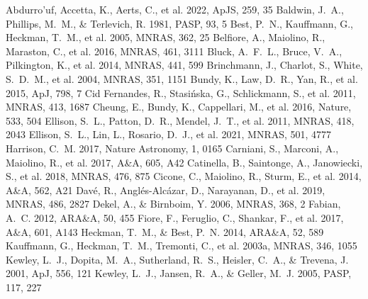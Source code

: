 \documentclass[twocolumn]{aastex631}
\begin{document}

\begin{thebibliography}{}
 Abdurro'uf, Accetta, K., Aerts, C., et al. 2022, ApJS, 259, 35
 Baldwin, J.~A., Phillips, M.~M., \& Terlevich, R. 1981, PASP, 93, 5
 Best, P.~N., Kauffmann, G., Heckman, T.~M., et al. 2005, MNRAS, 362, 25
 Belfiore, A., Maiolino, R., Maraston, C., et al. 2016, MNRAS, 461, 3111
 Bluck, A.~F.~L., Bruce, V.~A., Pilkington, K., et al. 2014, MNRAS, 441, 599
 Brinchmann, J., Charlot, S., White, S.~D.~M., et al. 2004, MNRAS, 351, 1151
 Bundy, K., Law, D.~R., Yan, R., et al. 2015, ApJ, 798, 7
 Cid Fernandes, R., Stasi{\'n}ska, G., Schlickmann, S., et al. 2011, MNRAS, 413, 1687
 Cheung, E., Bundy, K., Cappellari, M., et al. 2016, Nature, 533, 504
 Ellison, S.~L., Patton, D.~R., Mendel, J.~T., et al. 2011, MNRAS, 418, 2043
 Ellison, S.~L., Lin, L., Rosario, D.~J., et al. 2021, MNRAS, 501, 4777
 Harrison, C.~M. 2017, Nature Astronomy, 1, 0165
 Carniani, S., Marconi, A., Maiolino, R., et al. 2017, A\&A, 605, A42
 Catinella, B., Saintonge, A., Janowiecki, S., et al. 2018, MNRAS, 476, 875
 Cicone, C., Maiolino, R., Sturm, E., et al. 2014, A\&A, 562, A21
 Dav{\'e}, R., Angl{\'e}s-Alc{\'a}zar, D., Narayanan, D., et al. 2019, MNRAS, 486, 2827
 Dekel, A., \& Birnboim, Y. 2006, MNRAS, 368, 2
 Fabian, A.~C. 2012, ARA\&A, 50, 455
 Fiore, F., Feruglio, C., Shankar, F., et al. 2017, A\&A, 601, A143
 Heckman, T.~M., \& Best, P.~N. 2014, ARA\&A, 52, 589
 Kauffmann, G., Heckman, T.~M., Tremonti, C., et al. 2003a, MNRAS, 346, 1055
 Kewley, L.~J., Dopita, M.~A., Sutherland, R.~S., Heisler, C.~A., \& Trevena, J. 2001, ApJ, 556, 121
 Kewley, L.~J., Jansen, R.~A., \& Geller, M.~J. 2005, PASP, 117, 227

\end{thebibliography}
\end{document}
